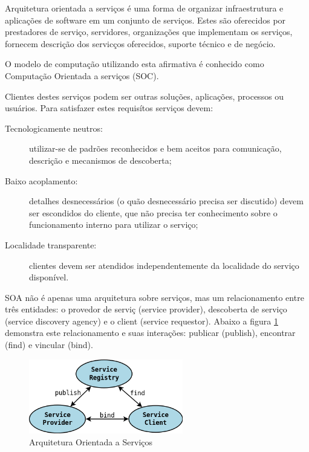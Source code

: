 Arquitetura orientada a servi\c{c}os \'e uma forma de organizar infraestrutura e aplica\c{c}\~oes de software em um conjunto de servi\c{c}os. Estes s\~ao oferecidos por prestadores de servi\c{c}o, servidores, organiza\c{c}\~oes que implementam os servi\c{c}os, fornecem descri\c{c}\~ao dos servic\c{c}os oferecidos, suporte t\'ecnico e de neg\'ocio.

O modelo de computa\c{c}\~ao utilizando esta afirmativa \'e conhecido como Computa\c{c}\~ao Orientada a servi\c{c}os (SOC). \cite{581580}

Clientes destes servi\c{c}os podem ser outras solu\c{c}\~oes, aplica\c{c}\~oes, processos ou usu\'arios. Para satisfazer estes requis\'itos servi\c{c}os devem:
\begin{description}
    \item[Tecnologicamente neutros:] utilizar-se de padr\~oes reconhecidos e bem aceitos para comunica\c{c}\~ao, descri\c{c}\~ao e mecanismos de descoberta;
    \item[Baixo acoplamento:] detalhes desnecess\'arios (o qu\~ao desnecess\'ario precisa ser discutido) devem ser escondidos do cliente, que n\~ao precisa ter conhecimento sobre o funcionamento interno para utilizar o servi\c{c}o;
    \item[Localidade transparente:] clientes devem ser atendidos independentemente da localidade do servi\c{c}o dispon\'ivel.
\end{description}

SOA n\~ao \'e apenas uma arquitetura sobre servi\c{c}os, mas um relacionamento entre tr\^es entidades: o provedor de servi\c{c} (service provider), descoberta de servi\c{c}o (service discovery agency) e o client (service requestor).  Abaixo a figura \ref{soaOverview} demonstra este relacionamento e suas intera\c{c}\~oes: publicar (publish), encontrar (find) e vincular (bind).

\begin{figure}[h]
   \label{soaOverview}
   \centering
   \includegraphics[width=0.6\textwidth]{figuras/soa.png}
   \caption{Arquitetura Orientada a Servi\c{c}os}
\end{figure}


